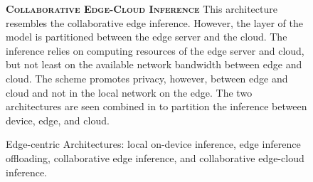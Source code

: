 \begin{figure}
\begin{minipage}{0.3\linewidth}
\begin{figure}
		\end{figure}
	\end{minipage}
	\begin{minipage}{0.5\linewidth}
		\centering
		\captionsetup[subfigure]{justification=centering}
		\begin{figure}
			\centering
		\end{figure}
	\end{minipage}
	\hfill
	\begin{minipage}{0.45\linewidth}
		\textbf{\protect{} \textsc{Collaborative Edge-Cloud Inference}}
		\color{caption-color} \newline
		This architecture resembles the collaborative edge inference. However, the layer of the model is partitioned between the edge server and the cloud. The inference relies on computing resources of the edge server and cloud, but not least on the available network bandwidth between edge and cloud. The scheme promotes privacy, however, between edge and cloud and not in the local network on the edge. The two architectures are seen combined in \cite{leroux_cascading_2017, teerapittayanon_distributed_2017} to partition the inference between device, edge, and cloud. 
	\end{minipage}
	\caption[Edge-centric Architectures]{Edge-centric Architectures: \protect{} local on-device inference, \protect{} edge inference offloading, \protect{} collaborative edge inference, and \protect{}  collaborative edge-cloud inference. }
	\label{fig:edge_arch}
\end{figure}

